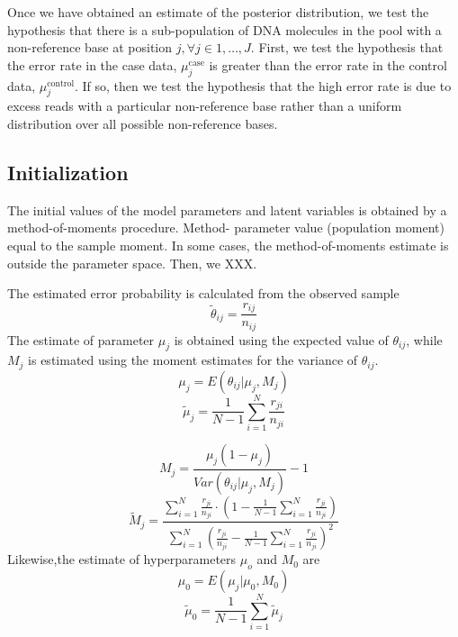 \documentclass[11pt,reqno]{amsart}
\begin{document}
Once we have obtained an estimate of the posterior distribution, we test the hypothesis that there is a sub-population of DNA molecules in the pool with a non-reference base at position $j, \forall j \in 1, \ldots, J$. First, we test the hypothesis that the error rate in the case data, $\mu_j^{\text{case}}$ is greater than the error rate in the control data, $\mu_j^{\text{control}}$. If so, then we test the hypothesis that the high error rate is due to excess reads with a particular non-reference base rather than a uniform distribution over all possible non-reference bases.

\subsection{Initialization}
The initial values of the model parameters and latent variables is obtained by a method-of-moments procedure. Method- parameter value (population moment) equal to the sample moment. In some cases, the method-of-moments estimate is outside the parameter space. Then, we XXX.

The estimated error probability is calculated from the observed sample
\begin{equation}
 \tilde{\theta}_{ij}=\frac{r_{ij}}{n_{ij}}
\end{equation}
The estimate of parameter $\mu_j$ is obtained using the expected value of $\theta_{ij}$, while $M_j$ is estimated using the moment estimates for the variance of $\theta_{ij}$.
\begin{equation}
 \mu_j=E(\theta_{ij}|\mu_j,M_j)
\end{equation}
\begin{equation}
 \tilde{\mu}_j =\frac{1}{N-1}\sum_{i=1}^N\frac{r_{ji}}{n_{ji}}
\end{equation}

\begin{equation}
 M_j=\frac{\mu_j(1-\mu_j)}{Var(\theta_{ij}|\mu_j,M_j)}-1
\end{equation}
\begin{equation}
 \tilde{M}_j = \frac{\sum_{i=1}^N\frac{r_{ji}}{n_{ji}}\cdot\left(1-\frac{1}{N-1}\sum_{i=1}^N\frac{r_{ji}}{n_{ji}}\right)}{\sum_{i=1}^N\left(\frac{r_{ji}}{n_{ji}}-\frac{1}{N-1}\sum_{i=1}^N\frac{r_{ji}}{n_{ji}}\right)^2}
\end{equation}
Likewise,the estimate of hyperparameters $\mu_o$ and $M_0$ are
\begin{equation}
 \mu_0=E(\mu_j|\mu_0,M_0)
\end{equation}
\begin{equation}
 \tilde{\mu}_0 =\frac{1}{N-1}\sum_{i=1}^N\tilde{\mu}_j
\end{equation}
\end{document}
